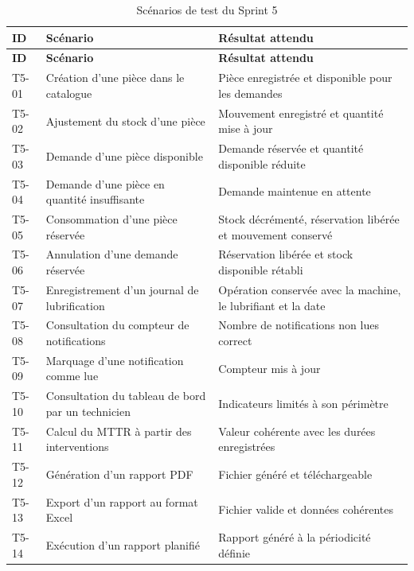 {\footnotesize
\setlength{\tabcolsep}{4pt}
\begin{longtable}{|p{0.9cm}|>{\raggedright\arraybackslash}p{7cm}|>{\raggedright\arraybackslash}p{4.7cm}|}
\caption{Scénarios de test du Sprint 5}
\label{tab:tests-sprint5}\\
\hline
\textbf{ID} & \textbf{Scénario} & \textbf{Résultat attendu} \\
\hline
\endfirsthead

\hline
\textbf{ID} & \textbf{Scénario} & \textbf{Résultat attendu} \\
\hline
\endhead

T5-01 &
Création d'une pièce dans le catalogue &
Pièce enregistrée et disponible pour les demandes \\
\hline

T5-02 &
Ajustement du stock d'une pièce &
Mouvement enregistré et quantité mise à jour \\
\hline

T5-03 &
Demande d'une pièce disponible &
Demande réservée et quantité disponible réduite \\
\hline

T5-04 &
Demande d'une pièce en quantité insuffisante &
Demande maintenue en attente \\
\hline

T5-05 &
Consommation d'une pièce réservée &
Stock décrémenté, réservation libérée et mouvement conservé \\
\hline

T5-06 &
Annulation d'une demande réservée &
Réservation libérée et stock disponible rétabli \\
\hline

T5-07 &
Enregistrement d'un journal de lubrification &
Opération conservée avec la machine, le lubrifiant et la date \\
\hline

T5-08 &
Consultation du compteur de notifications &
Nombre de notifications non lues correct \\
\hline

T5-09 &
Marquage d'une notification comme lue &
Compteur mis à jour \\
\hline

T5-10 &
Consultation du tableau de bord par un technicien &
Indicateurs limités à son périmètre \\
\hline

T5-11 &
Calcul du MTTR à partir des interventions &
Valeur cohérente avec les durées enregistrées \\
\hline

T5-12 &
Génération d'un rapport PDF &
Fichier généré et téléchargeable \\
\hline

T5-13 &
Export d'un rapport au format Excel &
Fichier valide et données cohérentes \\
\hline

T5-14 &
Exécution d'un rapport planifié &
Rapport généré à la périodicité définie \\
\hline

\end{longtable}}

